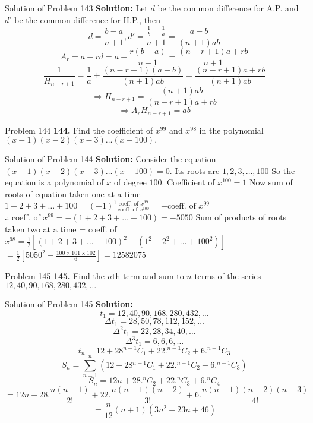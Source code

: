 \documentclass[aspectratio=1610,8pt]{beamer}
\begin{document}
\begin{frame}{Solution of Problem 143}
  \textbf{Solution:} Let $d$ be the common difference for A.P. and $d'$ be the common difference for H.P., then
  $$d = \frac{b - a}{n + 1}, d' = \frac{\frac{1}{b} - \frac{1}{a}}{n + 1} = \frac{a - b}{(n + 1)ab}$$
  $$A_r = a + rd = a + \frac{r(b - a)}{n + 1} = \frac{(n - r + 1)a + rb}{n + 1}$$
  $$\frac{1}{H_{n - r + 1}} = \frac{1}{a} + \frac{(n - r + 1)(a - b)}{(n + 1)ab} = \frac{(n - r + 1)a + rb}{(n + 1)ab}$$
  $$\Rightarrow H_{n - r + 1} = \frac{(n + 1)ab}{(n - r + 1)a + rb}$$
  $$\Rightarrow A_rH_{n - r + 1} = ab$$
\end{frame}
\begin{frame}{Problem 144}
  \textbf{144.} Find the coefficient of $x^{99}$ and $x^{98}$ in the polynomial $(x - 1)(x - 2)(x - 3)\ldots(x - 100).$
\end{frame}
\begin{frame}{Solution of Problem 144}
  \textbf{Solution:} Consider the equation $(x - 1)(x - 2)(x - 3)\ldots(x - 100) = 0.$ Its roots are $1, 2, 3, \ldots, 100$
  \linebreak\linebreak
  So the equation is a polynomial of $x$ of degree $100.$ Coefficient of $x^{100} = 1$
  \linebreak\linebreak
  Now sum of roots of equation taken one at a time
  \linebreak\linebreak
  $1 + 2 + 3 + \ldots + 100 = (-1)^1\frac{\text{coeff. of~}x^{99}}{\text{coeff. of~}x^{100}} = -\text{coeff. of~}x^{99}$
  \linebreak\linebreak
  $\therefore \text{~coeff. of~}x^{99} = -(1 + 2 + 3 + \ldots + 100) = -5050$
  \linebreak\linebreak
  Sum of products of roots taken two at a time = coeff. of $x^{98} = \frac{1}{2}[(1 + 2 + 3 + \ldots + 100)^2 - (1^2 + 2^2 +
    \ldots + 100^2)]$
  \linebreak\linebreak
  $= \frac{1}{2}\left[5050^2 - \frac{100\times101\times102}{6}\right] = 12582075$
\end{frame}
\begin{frame}{Problem 145}
  \textbf{145.} Find the $n$th term and sum to $n$ terms of the series $12, 40, 90, 168, 280, 432, \ldots$
\end{frame}
\begin{frame}{Solution of Problem 145}
  \textbf{Solution:} $$t_1 = 12, 40, 90, 168, 280, 432, \ldots$$
  $$\Delta t_1 = 28, 50, 78, 112, 152, \ldots$$
  $$\Delta^2 t_1 = 22, 28, 34, 40, \ldots$$
  $$\Delta^3 t_1 = 6, 6, 6, \ldots$$
  $$t_n = 12 + 28{}^{n - 1}C_1 + 22.{}^{n - 1}C_2 + 6.{}^{n - 1}C_3$$
  $$S_n = \sum_{n = 1}^n (12 + 28{}^{n - 1}C_1 + 22.{}^{n - 1}C_2 + 6.{}^{n - 1}C_3)$$
  $$S_n = 12n + 28.{}^nC_2 + 22.{}^nC_3 + 6.{}^nC_4$$
  $$= 12n + 28.\frac{n(n - 1)}{2!} + 22.\frac{n(n - 1)(n - 2)}{3!} + 6.\frac{n(n - 1)(n - 2)(n - 3)}{4!}$$
  $$= \frac{n}{12}(n + 1)(3n^2 + 23n + 46)$$
\end{frame}
\end{document}
